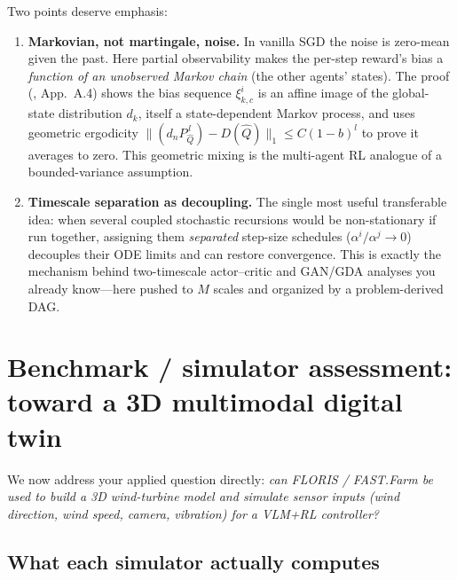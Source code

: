 \documentclass[11pt]{article}
\theoremstyle{plain}
\theoremstyle{definition}
\begin{document}
\noindent Two points deserve emphasis:
\begin{enumerate}[leftmargin=1.5em,itemsep=2pt]
  \item \textbf{Markovian, not martingale, noise.} In vanilla SGD the noise is
  zero-mean given the past. Here partial observability makes the per-step
  reward's bias a \emph{function of an unobserved Markov chain} (the other
  agents' states). The proof (\cite{P2}, App.~A.4) shows the bias sequence
  $\xi^i_{k,c}$ is an affine image of the global-state distribution $d_k$,
  itself a state-dependent Markov process, and uses geometric ergodicity
  $\|(d_n P_{\hat Q}^{\,l}) - D(\hat Q)\|_1 \le C(1-b)^l$ to prove it averages
  to zero. This geometric mixing is the multi-agent RL analogue of a
  bounded-variance assumption.
  \item \textbf{Timescale separation as decoupling.} The single most useful
  transferable idea: when several coupled stochastic recursions would be
  non-stationary if run together, assigning them \emph{separated} step-size
  schedules ($\alpha^i/\alpha^j\to0$) decouples their ODE limits and can
  restore convergence. This is exactly the mechanism behind two-timescale
  actor--critic and GAN/GDA analyses you already know---here pushed to $M$
  scales and organized by a problem-derived DAG.
\end{enumerate}

\section{Benchmark / simulator assessment: toward a 3D multimodal digital twin}
\label{sec:simassess}

We now address your applied question directly: \emph{can FLORIS / FAST.Farm
be used to build a 3D wind-turbine model and simulate sensor inputs (wind
direction, wind speed, camera, vibration) for a VLM+RL controller?}

\subsection{What each simulator actually computes}
\end{document}
